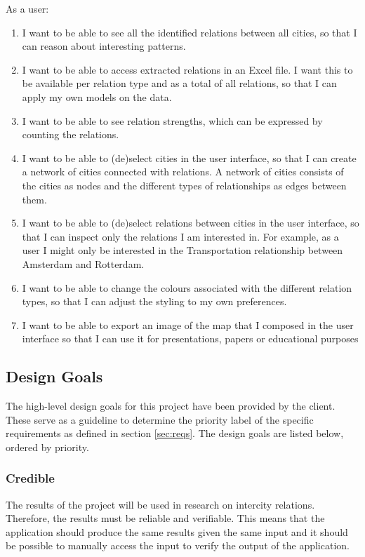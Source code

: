 As a user:
\begin{enumerate}
    \item I want to be able to see all the identified relations between all cities, so that I can reason about interesting patterns.
    \item I want to be able to access extracted relations in an Excel file. I want this to be available per relation type and as a total of all relations, so that I can apply my own models on the data.
    \item I want to be able to see relation strengths, which can be expressed by counting the relations.
    \item I want to be able to (de)select cities in the user interface, so that I can create a network of cities connected with relations. A network of cities consists of the cities as nodes and the different types of relationships as edges between them.
    \item I want to be able to (de)select relations between cities in the user interface, so that I can inspect only the relations I am interested in. For example, as a user I might only be interested in the Transportation relationship between Amsterdam and Rotterdam.
    \item I want to be able to change the colours associated with the different relation types, so that I can adjust the styling to my own preferences.
    \item I want to be able to export an image of the map that I composed in the user interface so that I can use it for presentations, papers or educational purposes
\end{enumerate}

\subsection{Design Goals} \label{sec:design-goals}
The high-level design goals for this project have been provided by the client. These serve as a guideline to determine the priority label of the specific requirements as defined in section \ref{sec:reqs}. The design goals are listed below, ordered by priority. 

\subsubsection{Credible} The results of the project will be used in research on intercity relations. Therefore, the results must be reliable and verifiable. This means that the application should produce the same results given the same input and it should be possible to manually access the input to verify the output of the application.
